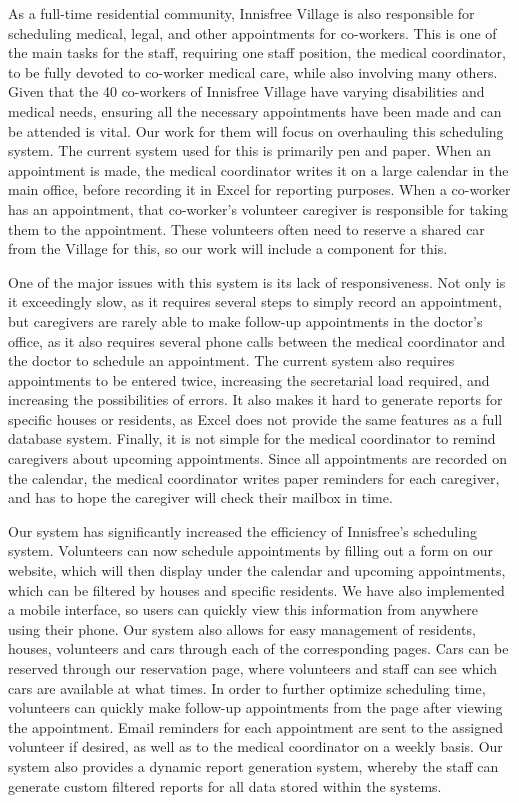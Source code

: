 \documentclass{sig-alternate}
\begin{document}
As a full-time residential community, Innisfree Village is also responsible for scheduling medical, legal, and other appointments for co-workers. This is one of the main tasks for the staff, requiring one staff position, the medical coordinator, to be fully devoted to co-worker medical care, while also involving many others. Given that the 40 co-workers of Innisfree Village have varying disabilities and medical needs, ensuring all the necessary appointments have been made and can be attended is vital. Our work for them will focus on overhauling this scheduling system. The current system used for this is primarily pen and paper. When an appointment is made, the medical coordinator writes it on a large calendar in the main office, before recording it in Excel for reporting purposes. When a co-worker has an appointment, that co-worker’s volunteer caregiver is responsible for taking them to the appointment. These volunteers often need to reserve a shared car from the Village for this, so our work will include a component for this.

One of the major issues with this system is its lack of responsiveness. Not only is it exceedingly slow, as it requires several steps to simply record an appointment, but caregivers are rarely able to make follow-up appointments in the doctor’s office, as it also requires several phone calls between the medical coordinator and the doctor to schedule an appointment. The current system also requires appointments to be entered twice, increasing the secretarial load required, and increasing the possibilities of errors. It also makes it hard to generate reports for specific houses or residents, as Excel does not provide the same features as a full database system. Finally, it is not simple for the medical coordinator to remind caregivers about upcoming appointments. Since all appointments are recorded on the calendar, the medical coordinator writes paper reminders for each caregiver, and has to hope the caregiver will check their mailbox in time.

Our system has significantly increased the efficiency of Innisfree's scheduling system. Volunteers can now schedule appointments by filling out a form on our website, which will then display under the calendar and upcoming appointments, which can be filtered by houses and specific residents. We have also implemented a mobile interface, so users can quickly view this information from anywhere using their phone. Our system also allows for easy management of residents, houses, volunteers and cars through each of the corresponding pages. Cars can be reserved through our reservation page, where volunteers and staff can see which cars are available at what times. In order to further optimize scheduling time, volunteers can quickly make follow-up appointments from the page after viewing the appointment. Email reminders for each appointment are sent to the assigned volunteer if desired, as well as to the medical coordinator on a weekly basis. Our system also provides a dynamic report generation system, whereby the staff can generate custom filtered reports for all data stored within the systems.
\end{document}
